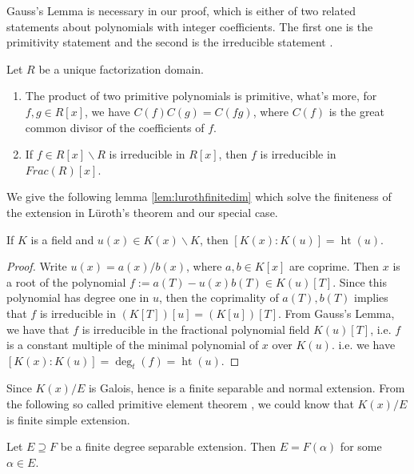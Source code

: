 Gauss's Lemma is necessary in our proof, which is either of two related statements about polynomials with integer coefficients. The first one is the primitivity statement and the second is the irreducible statement \citep{zieve2011mathematics}.

\begin{lemma}
Let $R$ be a unique factorization domain.
\begin{enumerate}
\item The product of two primitive polynomials is primitive, what's more, for $f,g\in R[x]$, we have $C(f)C(g)= C(fg)$, where $C(f)$ is the great common divisor of the coefficients of $f$.
\item If $f\in R[x]\backslash R$ is irreducible in $R[x]$, then $f$ is irreducible in $Frac(R)[x]$.
\end{enumerate}
\end{lemma}

We give the following lemma \ref{lem:lurothfinitedim} which solve the finiteness of the extension in L{\"u}roth's theorem and our special case.

\begin{lemma}\label{lem:lurothfinitedim}
If $K$ is a field and $u(x)\in K(x)\backslash K$, then $[K(x):K(u)]=\operatorname{ht}(u)$.
\begin{proof}
Write $u(x)=a(x)/b(x)$, where $a,b\in K[x]$ are coprime. Then $x$ is a root of the polynomial $f:=a(T)-u(x)b(T)\in K(u)[T]$. Since this polynomial has degree one in $u$, then the coprimality of $a(T),b(T)$ implies that $f$ is irreducible in $(K[T])[u]=(K[u])[T]$. 
From Gauss's Lemma, we have that $f$ is irreducible in the fractional polynomial field $K(u)[T]$, i.e. $f$ is a constant multiple of the minimal polynomial of $x$ over $K(u)$. i.e. we have $[K(x):K(u)]=\deg_{t}(f)=\operatorname{ht}(u)$. 
\end{proof}
\end{lemma}

Since $K(x)/E$ is Galois, hence is a finite separable and normal extension. From the following so called primitive element theorem , we could know that $K(x)/E$ is finite simple extension.

\begin{lemma}
Let $E\supseteq F$ be a finite degree separable extension. Then $E=F(\alpha)$ for some $\alpha\in E$.
\end{lemma}  


